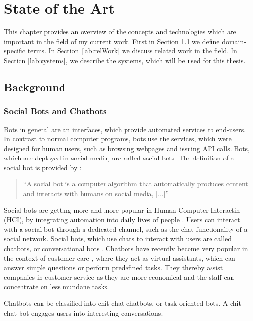 \chapter{State of the Art}
This chapter provides an overview of the concepts and technologies which are important in the field of my current work. First in Section \ref{lab:background} we define domain-specific terms. In Section \ref{lab:relWork} we discuss related work in the field. In Section \ref{lab:systems}, we describe the systems, which will be used for this thesis.

\section{Background} \label{lab:background}

\subsection{Social Bots and Chatbots}
Bots in general are an interfaces, which provide automated services to end-users. In contrast to normal computer programs, bots use the services, which were designed for human users, such as browsing webpages and issuing API calls. Bots, which are deployed in social media, are called social bots. The definition of a social bot is provided by \cite{FVD*16b}:
\begin{quote}
	``A social bot is a computer algorithm that automatically produces content and interacts with humans on social media, [...]''
\end{quote}

Social bots are getting more and more popular in Human-Computer Interactin (HCI), by integrating automation into daily lives of people \cite{BFPN17}. Users can interact with a social bot through a dedicated channel, such as the chat functionality of a social network. Social bots, which use chats to interact with users are called chatbots, or conversational bots \cite{WWX*16}. Chatbots have recently become very popular in the context of customer care \cite{CHW*17,FVD*16b}, where they act as virtual assistants, which can answer simple questions \cite{CaWh14} or perform predefined tasks. They thereby assist companies in customer service as they are more economical and the staff can concentrate on less mundane tasks.

Chatbots can be classified into chit-chat chatbots, or task-oriented bots. A chit-chat bot engages users into interesting conversations.

